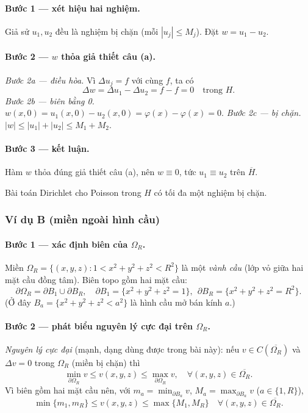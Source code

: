 \paragraph{Bước 1 --- xét hiệu hai nghiệm.}
Giả sử $u_1,u_2$ đều là nghiệm bị chặn (mỗi $|u_j|\le M_j$). Đặt $w=u_1-u_2$.

\paragraph{Bước 2 --- $w$ thỏa giả thiết câu (a).}
\emph{Bước 2a --- điều hòa.} Vì $\Delta u_j=f$ với cùng $f$, ta có
\[
\Delta w=\Delta u_1-\Delta u_2=f-f=0 \quad\text{trong } H.
\]
\emph{Bước 2b --- biên bằng 0.} $w(x,0)=u_1(x,0)-u_2(x,0)=\varphi(x)-\varphi(x)=0$.
\emph{Bước 2c --- bị chặn.} $|w|\le |u_1|+|u_2|\le M_1+M_2$.

\paragraph{Bước 3 --- kết luận.}
Hàm $w$ thỏa đúng giả thiết câu (a), nên $w\equiv 0$, tức $u_1\equiv u_2$ trên $\overline H$.

\begin{nhobox}
Bài toán Dirichlet cho Poisson trong $H$ có tối đa một nghiệm bị chặn.
\end{nhobox}

\subsubsection*{Ví dụ B (miền ngoài hình cầu)}

\paragraph{Bước 1 --- xác định biên của $\Omega_R$.}
Miền $\Omega_R=\{(x,y,z):1<x^2+y^2+z^2<R^2\}$ là một \emph{vành cầu} (lớp vỏ giữa hai mặt cầu đồng tâm). Biên topo gồm hai mặt cầu:
\[
\partial\Omega_R=\partial B_1\cup\partial B_R,\quad
\partial B_1=\{x^2+y^2+z^2=1\},\ \
\partial B_R=\{x^2+y^2+z^2=R^2\}.
\]
(Ở đây $B_a=\{x^2+y^2+z^2<a^2\}$ là hình cầu mở bán kính $a$.)

\paragraph{Bước 2 --- phát biểu nguyên lý cực đại trên $\Omega_R$.}
\emph{Nguyên lý cực đại} (mạnh, dạng dùng được trong bài này): nếu $v\in C(\overline{\Omega_R})$ và $\Delta v=0$ trong $\Omega_R$ (miền bị chặn) thì
\[
\min_{\partial\Omega_R} v\le v(x,y,z)\le \max_{\partial\Omega_R} v,\quad \forall(x,y,z)\in\overline{\Omega_R}.
\]
Vì biên gồm hai mặt cầu nên, với $m_a=\min_{\partial B_a}v$, $M_a=\max_{\partial B_a}v$ ($a\in\{1,R\}$),
\[
\boxed{\,\min\{m_1,m_R\}\le v(x,y,z)\le \max\{M_1,M_R\}\quad \forall(x,y,z)\in\overline{\Omega_R}.\,}
\]

